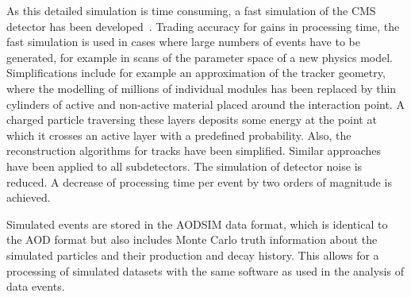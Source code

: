 As this detailed simulation is time consuming, a fast simulation of the CMS detector has been developed~\cite{1742-6596-331-3-032049}. Trading accuracy for gains in processing time, the fast simulation is used in cases where large numbers of events have to be generated, for example in scans of the parameter space of a new physics model. Simplifications include for example an approximation of the tracker geometry, where the modelling of millions of individual modules has been replaced by thin cylinders of active and non-active material placed around the interaction point. A charged particle traversing these layers deposits some energy at the point at which it crosses an active layer with a predefined probability. Also, the reconstruction algorithms for tracks have been simplified. Similar approaches have been applied to all subdetectors. The simulation of detector noise is reduced. A decrease of processing time per event by two orders of magnitude is achieved. 

Simulated events are stored in the AODSIM data format, which is identical to the AOD format but also includes Monte Carlo truth information about the simulated particles and their production and decay history. This allows for a processing of simulated datasets with the same software as used in the analysis of data events. 
